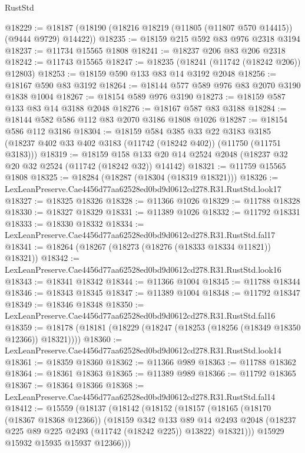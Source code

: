 \begin{lexlean}{RustStd}
\begin{coremodule}
@18229 := @18187 (@18190 (@18216 @18219 (@11805 (@11807 @570 @14415)) (@9444 @9729) @14422))
@18235 := @18159 @215 @592 @83 @976 @2318 @3194
@18237 := @11734 @15565 @1808
@18241 := @18237 @206 @83 @206 @2318
@18242 := @11743 @15565
@18247 := @18235 (@18241 (@11742 (@18242 @206)) @12803)
@18253 := @18159 @590 @133 @83 @14 @3192 @2048
@18256 := @18167 @590 @83 @3192
@18264 := @18144 @577 @589 @976 @83 @2070 @3190 @1838 @1004
@18267 := @18154 @589 @976 @3190
@18273 := @18159 @587 @133 @83 @14 @3188 @2048
@18276 := @18167 @587 @83 @3188
@18284 := @18144 @582 @586 @112 @83 @2070 @3186 @1808 @1026
@18287 := @18154 @586 @112 @3186
@18304 := @18159
    @584
    @385
    @33
    @22
    @3183
    @3185
    (@18237 @402 @33 @402 @3183 (@11742 (@18242 @402)) (@11750 (@11751 @3183)))
@18319 := @18159
    @158
    @133
    @20
    @14
    @2524
    @2048
    (@18237 @32 @20 @32 @2524 (@11742 (@18242 @32)) @14142)
@18321 := @11759 @15565 @1808
@18325 := @18284 (@18287 (@18304 (@18319 @18321)))
@18326 := LexLeanPreserve.Cae4456d77aa62528ed0bd9d0612cd278.R31.RustStd.look17
@18327 := @18325 @18326
@18328 := @11366 @1026
@18329 := @11788 @18328
@18330 := @18327 @18329
@18331 := @11389 @1026
@18332 := @11792 @18331
@18333 := @18330 @18332
@18334 := LexLeanPreserve.Cae4456d77aa62528ed0bd9d0612cd278.R31.RustStd.fal17
@18341 := @18264 (@18267 (@18273 (@18276 (@18333 @18334 @11821)) @18321))
@18342 := LexLeanPreserve.Cae4456d77aa62528ed0bd9d0612cd278.R31.RustStd.look16
@18343 := @18341 @18342
@18344 := @11366 @1004
@18345 := @11788 @18344
@18346 := @18343 @18345
@18347 := @11389 @1004
@18348 := @11792 @18347
@18349 := @18346 @18348
@18350 := LexLeanPreserve.Cae4456d77aa62528ed0bd9d0612cd278.R31.RustStd.fal16
@18359 := @18178 (@18181 (@18229 (@18247 (@18253 (@18256 (@18349 @18350 @12366)) @18321))))
@18360 := LexLeanPreserve.Cae4456d77aa62528ed0bd9d0612cd278.R31.RustStd.look14
@18361 := @18359 @18360
@18362 := @11366 @989
@18363 := @11788 @18362
@18364 := @18361 @18363
@18365 := @11389 @989
@18366 := @11792 @18365
@18367 := @18364 @18366
@18368 := LexLeanPreserve.Cae4456d77aa62528ed0bd9d0612cd278.R31.RustStd.fal14
@18412 := @15559
    (@18137
      (@18142
        (@18152
          (@18157
            (@18165
              (@18170 (@18367 @18368 @12366))
              (@18159
                @342
                @133
                @89
                @14
                @2493
                @2048
                (@18237 @225 @89 @225 @2493 (@11742 (@18242 @225)) @13822)
                @18321)))
          @15929
          @15932
          @15935
          @15937
          @12366)))

\end{coremodule}
\end{lexlean}
